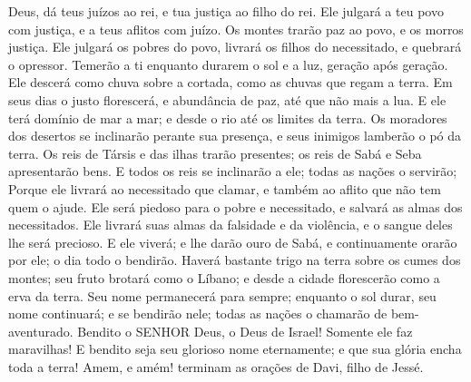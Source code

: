 
{\PP 
  Deus, dá teus juízos ao rei, e tua justiça ao filho do rei.
  Ele julgará a teu povo com justiça, e a teus aflitos com juízo.
  Os montes trarão paz ao povo, e os morros
{} justiça.
  Ele julgará os pobres do povo, livrará os filhos do necessitado, e quebrará o opressor.
  Temerão a ti enquanto durarem o sol e a luz, geração após geração.
  Ele descerá como chuva sobre a
{} cortada, como as chuvas que regam a terra.
  Em seus dias o justo florescerá, e
{} abundância de paz, até que não
{} mais a lua.
  E ele terá domínio de mar a mar; e desde o rio até os limites da terra.
  Os moradores dos desertos se inclinarão perante sua presença, e seus inimigos lamberão o pó da terra.
  Os reis de Társis e das ilhas trarão presentes; os reis de Sabá e Seba apresentarão bens.
  E todos os reis se inclinarão a ele; todas as nações o servirão;
  Porque ele livrará ao necessitado que clamar, e também ao aflito que não tem quem o ajude.
  Ele será piedoso para o pobre e necessitado, e salvará as almas dos necessitados.
  Ele livrará suas almas da falsidade e da violência, e o sangue deles lhe será precioso.
  E ele viverá; e lhe darão ouro de Sabá, e continuamente orarão por ele; o dia todo o bendirão.
  Haverá bastante trigo na terra sobre os cumes dos montes; seu fruto brotará como o Líbano; e desde a cidade florescerão como a erva da terra.
  Seu nome permanecerá para sempre; enquanto o sol durar, seu nome continuará; e se bendirão nele; todas as nações o chamarão de bem-aventurado.
  Bendito
{} o SENHOR Deus, o Deus de Israel! Somente ele faz
{} maravilhas!
  E bendito seja seu glorioso nome eternamente; e que sua glória encha toda a terra! Amem, e amém!
   terminam as orações de Davi, filho de Jessé.
\par }


